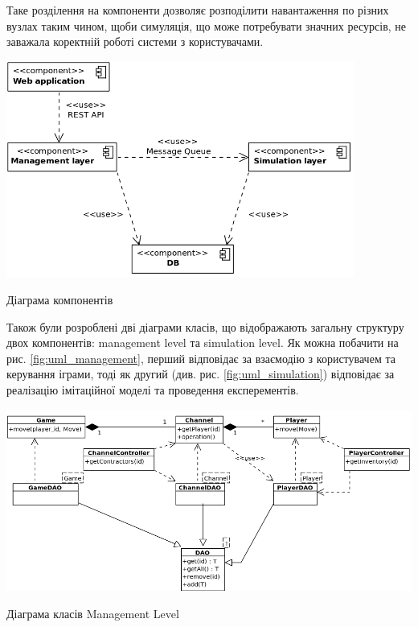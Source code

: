 Таке розділення на компоненти дозволяє розподілити навантаження по різних вузлах таким чином, щоби симуляція, що може потребувати значних ресурсів, не заважала коректній роботі системи з користувачами.
\begin{stdfigure}
    \includegraphics[width=4.5in]{images/uml/component_diagram.png}
    \caption{Діаграма компонентів}
    \label{fig:uml_components}
\end{stdfigure}   

Також були розроблені дві діаграми класів, що відображають загальну структуру двох компонентів: management level та simulation level. Як можна побачити на рис. \ref{fig:uml_management}, перший відповідає за взаємодію з користувачем та керування іграми, тоді як другий (див. рис. \ref{fig:uml_simulation}) відповідає за реалізацію імітаційної моделі та проведення експерементів.

\begin{stdfigure}
    \includegraphics[width=7in]{images/uml/management_level.png}
    \caption{Діаграма класів Management Level}
    \label{fig:uml_management}
\end{stdfigure}   

